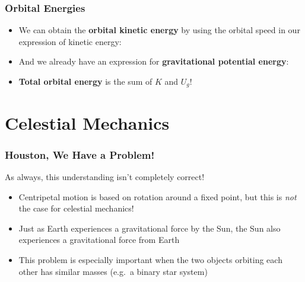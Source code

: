 \documentclass[12pt,compress,aspectratio=169]{beamer}
\begin{document}
\begin{frame}
  \frametitle{Orbital Energies}
  \begin{itemize}
  \item We can obtain the \textbf{orbital kinetic energy} by using the orbital
    speed in our expression of kinetic energy:

  \item And we already have an expression for
    \textbf{gravitational potential energy}:

  \item\textbf{Total orbital energy} is the sum of $K$ and $U_g$!

  \end{itemize}
\end{frame}





\section{Celestial Mechanics}


\begin{frame}
  \frametitle{Houston, We Have a Problem!}
  As always, this understanding isn't completely correct!
  \begin{itemize}
  \item Centripetal motion is based on rotation around a fixed point, but this
    is \emph{not} the case for celestial mechanics!
  \item Just as Earth experiences a gravitational force by the Sun, the Sun
    also experiences a gravitational force from Earth
  \item This problem is especially important when the two objects orbiting each
    other has similar masses (e.g.\ a binary star system)
  \end{itemize}
\end{frame}
\end{document}
